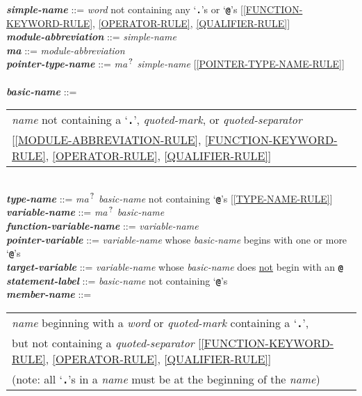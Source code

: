 \documentclass[12pt]{article}
\newcommand{\TT}[1]{{\tt \bfseries #1}}
\newcommand{\QMARK}{{$^{\,\mbox{\footnotesize ?}}$}}
\newcommand{\MA}{{\em ma}\QMARK}
\newcommand{\emkey}[1]{{\em \bfseries #1}}
\newenvironment{indpar}[1][0.3in]%
	{\begin{list}{}%
		     {\setlength{\itemsep}{0in}%
		      \setlength{\topsep}{0in}%
		      \setlength{\parsep}{1ex}%
		      \setlength{\labelwidth}{#1}%
		      \setlength{\leftmargin}{#1}%
		      \addtolength{\leftmargin}{\labelsep}}%
	 \item}%
	{\end{list}}
\begin{document}
\begin{indpar}
\emkey{simple-name} ::= {\em word} not containing any `\TT{.}'s or `\TT{@}'s
    [\ref{FUNCTION-KEYWORD-RULE},
     \ref{OPERATOR-RULE},
     \ref{QUALIFIER-RULE}] \\
\emkey{module-abbreviation}\label{MODULE-ABBREVIATION} ::= {\em simple-name} \\
\emkey{ma} ::= {\em module-abbreviation} \\
\emkey{pointer-type-name}\label{POINTER-TYPE-NAME} ::=
    \MA{} {\em simple-name}
    [\ref{POINTER-TYPE-NAME-RULE}] \\
\\[1ex]
\emkey{basic-name}\label{BASIC-NAME} ::=
	\begin{tabular}[t]{@{}l}
	{\em name} not containing a `\TT{.}', {\em quoted-mark}, or
	    {\em quoted-separator} \\{}
	[\ref{MODULE-ABBREVIATION-RULE},
	 \ref{FUNCTION-KEYWORD-RULE},
	 \ref{OPERATOR-RULE},
	 \ref{QUALIFIER-RULE}] \\
	\end{tabular} \\
\emkey{type-name}\label{TYPE-NAME} ::=
    \MA{} {\em basic-name} not containing `\TT{@}'s
	[\ref{TYPE-NAME-RULE}] \\
\emkey{variable-name}\label{VARIABLE-NAME} ::=
    \MA{} {\em basic-name} \\
\emkey{function-variable-name}\label{FUNCTION-VARIABLE-NAME} ::=
    {\em variable-name} \\
\emkey{pointer-variable}\label{POINTER-VARIABLE} ::=
    {\em variable-name} whose {\em basic-name} begins with one or more
    `\TT{@}'s \\
\emkey{target-variable}\label{TARGET-VARIABLE} ::=
    {\em variable-name} whose {\em basic-name} does \underline{not}
    begin with an \TT{@} \\
\emkey{statement-label} ::= {\em basic-name}
    \label{STATEMENT-LABEL} not containing `\TT{@}'s
\\[1ex]
\emkey{member-name}\label{MEMBER-NAME}
	::= \begin{tabular}[t]{@{}l@{}}
                        {\em name} beginning with a {\em word} or
			{\em quoted-mark} containing a `\TT{.}', \\
			but not containing a {\em quoted-separator}
			[\ref{FUNCTION-KEYWORD-RULE},
			 \ref{OPERATOR-RULE},
			 \ref{QUALIFIER-RULE}] \\
			(note: all `\TT{.}'s in a {\em name} must be at
			 the beginning of the {\em name})

\end{tabular}
\end{indpar}
\end{document}

